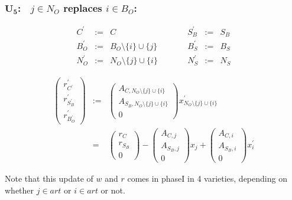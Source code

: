\documentclass[a4paper]{article}
\begin{document}
\subsubsection{$\mathbf{U_{5}}$:$\quad j \in N_{O}$ replaces $i \in B_{O}$:}
\begin{equation}
\label{update:o_rep_o}
\begin{array}{ccccccc}
C^{\prime}      &:=&  C
&\quad\quad&
S_{B}^{\prime}  &:=&  S_{B}  \\
B_{O}^{\prime}  &:=&  B_{O} \setminus \{i\} \cup \{j\}
&\quad\quad&
B_{S}^{\prime}  &:=&  B_{S}   \\
N_{O}^{\prime}  &:=&  N_{O}  \setminus \{j\} \cup \{i\}
&\quad\quad&
N_{S}^{\prime}  &:=&  N_{S} 
\end{array}
\end{equation}

\begin{eqnarray}
\left(
\begin{array}{c}
r_{C^{\prime}}^{\prime} \\
\hline
r_{S_{B}^{\prime}}^{\prime} \\
\hline
r_{B_{O}^{\prime}}^{\prime}
\end{array}
\right)
&:=&
\left(
\begin{array}{c}
A_{C, N_{O}  \setminus \{j\} \cup \{i\}} \\
\hline
A_{S_{B}, N_{O} \setminus \{j\} \cup \{i\}} \\
\hline
0
\end{array}
\right)
x_{N_{O}  \setminus \{j\} \cup \{i\}}^{\prime}
\nonumber \\
&=&
\left(
\begin{array}{c}
r_{C} \\
\hline
r_{S_{B}} \\
\hline
0
\end{array}
\right)
-
\left(
\begin{array}{c}
A_{C, j} \\
\hline
A_{S_{B}, j} \\
\hline
0
\end{array}
\right)
x_{j}
+
\left(
\begin{array}{c}
A_{C, i} \\
\hline
A_{S_{B}, i} \\
\hline
0
\end{array}
\right)
x_{i}^{\prime}
\end{eqnarray}

Note that this update of $w$ and $r$ comes in phaseI in 4 varieties,
depending on whether $j \in art$ or $i \in art$ or not.
\end{document}
